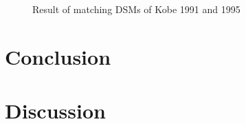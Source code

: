 \begin{figure}[htbp]
\begin{center}
{\begin{minipage}[t]{0.45\linewidth}
			\end{minipage}%
		}
		\caption{Result of matching DSMs of Kobe 1991 and 1995}
		\label{Match result}
	\end{center}
\end{figure} 


\section{Conclusion}

\section{Discussion}
